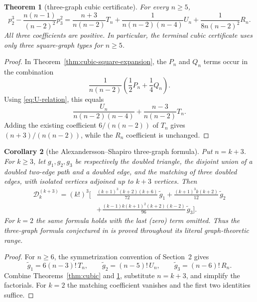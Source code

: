 \documentclass[11pt]{amsart}
\numberwithin{equation}{section}
\newtheorem{theorem}{Theorem}
\newtheorem{corollary}[theorem]{Corollary}
\newcommand{\D}{\mathcal D}
\begin{document}
\begin{theorem}[three-graph cubic certificate]\label{thm:cubic-threegraph}
For every $n\ge5$,
\begin{equation}\label{eq:cubic-threegraph}
\boxed{
 p_2^3-\frac{n(n-1)}{(n-2)^2}p_3^2
=
\frac{n+3}{n(n-2)}T_n
+\frac{1}{n(n-2)(n-4)}U_n
+\frac{1}{8n(n-2)^2}R_n .}
\end{equation}
All three coefficients are positive.  In particular, the terminal cubic
certificate uses only three square-graph types for $n\ge5$.
\end{theorem}

\begin{proof}
In Theorem~\ref{thm:cubic-square-expansion}, the $P_n$ and $Q_n$ terms occur
in the combination
\[
\frac{1}{n(n-2)}\left(\frac12P_n+\frac14Q_n\right).
\]
Using \eqref{eq:U-relation}, this equals
\[
\frac{U_n}{n(n-2)(n-4)}+\frac{n-3}{n(n-2)}T_n.
\]
Adding the existing coefficient $6/(n(n-2))$ of $T_n$ gives
$(n+3)/(n(n-2))$, while the $R_n$ coefficient is unchanged.
\end{proof}

\begin{corollary}[the Alexandersson--Shapiro three-graph formula]
\label{cor:AS-threegraph}
Put $n=k+3$.  For $k\ge3$, let $g_1,g_2,g_3$ be respectively the doubled
triangle, the disjoint union of a doubled two-edge path and a doubled edge,
and the matching of three doubled edges, with isolated vertices adjoined up
to $k+3$ vertices.  Then
\begin{align*}
\D_k^{(k+3)}=(k!)^3\Bigg[&
\frac{(k+1)^3(k+2)(k+6)}{72}\,\widetilde g_1
+\frac{(k+1)^3k(k+2)}{12}\,\widetilde g_2\\
&+\frac{(k-1)k(k+1)^2(k+2)(k-2)}{96}\,\widetilde g_3
\Bigg].
\end{align*}
For $k=2$ the same formula holds with the last (zero) term omitted.  Thus the
three-graph formula conjectured in \cite[Example~3]{AS} is proved throughout
its literal graph-theoretic range.
\end{corollary}

\begin{proof}
For $n\ge6$, the symmetrization convention of Section~2 gives
\[
\widetilde g_1=6(n-3)!\,T_n,\qquad
\widetilde g_2=(n-5)!\,U_n,\qquad
\widetilde g_3=(n-6)!\,R_n.
\]
Combine Theorems~\ref{thm:cubic} and \ref{thm:cubic-threegraph}, substitute
$n=k+3$, and simplify the factorials.  For $k=2$ the matching coefficient
vanishes and the first two identities suffice.
\end{proof}
\end{document}
